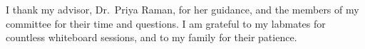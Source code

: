 I thank my advisor, Dr.\ Priya Raman, for her guidance, and the members of my committee for
their time and questions. I am grateful to my labmates for countless whiteboard sessions, and to
my family for their patience.

